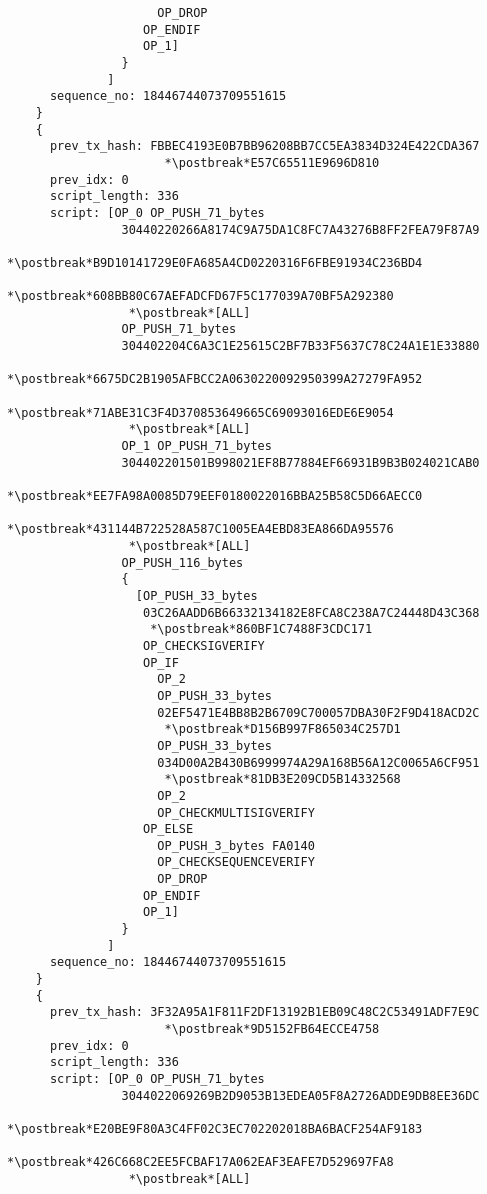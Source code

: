 \begin{lstlisting}
                     OP_DROP
                   OP_ENDIF
                   OP_1]
                }
              ]
      sequence_no: 18446744073709551615
    }
    {
      prev_tx_hash: FBBEC4193E0B7BB96208BB7CC5EA3834D324E422CDA367
                      *\postbreak*E57C65511E9696D810
      prev_idx: 0
      script_length: 336
      script: [OP_0 OP_PUSH_71_bytes
                30440220266A8174C9A75DA1C8FC7A43276B8FF2FEA79F87A9
                 *\postbreak*B9D10141729E0FA685A4CD0220316F6FBE91934C236BD4
                 *\postbreak*608BB80C67AEFADCFD67F5C177039A70BF5A292380
                 *\postbreak*[ALL]
                OP_PUSH_71_bytes
                304402204C6A3C1E25615C2BF7B33F5637C78C24A1E1E33880
                 *\postbreak*6675DC2B1905AFBCC2A0630220092950399A27279FA952
                 *\postbreak*71ABE31C3F4D370853649665C69093016EDE6E9054
                 *\postbreak*[ALL]
                OP_1 OP_PUSH_71_bytes
                304402201501B998021EF8B77884EF66931B9B3B024021CAB0
                 *\postbreak*EE7FA98A0085D79EEF0180022016BBA25B58C5D66AECC0
                 *\postbreak*431144B722528A587C1005EA4EBD83EA866DA95576
                 *\postbreak*[ALL]
                OP_PUSH_116_bytes
                {
                  [OP_PUSH_33_bytes
                   03C26AADD6B66332134182E8FCA8C238A7C24448D43C368
                    *\postbreak*860BF1C7488F3CDC171
                   OP_CHECKSIGVERIFY
                   OP_IF
                     OP_2
                     OP_PUSH_33_bytes
                     02EF5471E4BB8B2B6709C700057DBA30F2F9D418ACD2C
                      *\postbreak*D156B997F865034C257D1
                     OP_PUSH_33_bytes
                     034D00A2B430B6999974A29A168B56A12C0065A6CF951
                      *\postbreak*81DB3E209CD5B14332568
                     OP_2
                     OP_CHECKMULTISIGVERIFY
                   OP_ELSE
                     OP_PUSH_3_bytes FA0140
                     OP_CHECKSEQUENCEVERIFY
                     OP_DROP
                   OP_ENDIF
                   OP_1]
                }
              ]
      sequence_no: 18446744073709551615
    }
    {
      prev_tx_hash: 3F32A95A1F811F2DF13192B1EB09C48C2C53491ADF7E9C
                      *\postbreak*9D5152FB64ECCE4758
      prev_idx: 0
      script_length: 336
      script: [OP_0 OP_PUSH_71_bytes
                3044022069269B2D9053B13EDEA05F8A2726ADDE9DB8EE36DC
                 *\postbreak*E20BE9F80A3C4FF02C3EC702202018BA6BACF254AF9183
                 *\postbreak*426C668C2EE5FCBAF17A062EAF3EAFE7D529697FA8
                 *\postbreak*[ALL]

\end{lstlisting}
